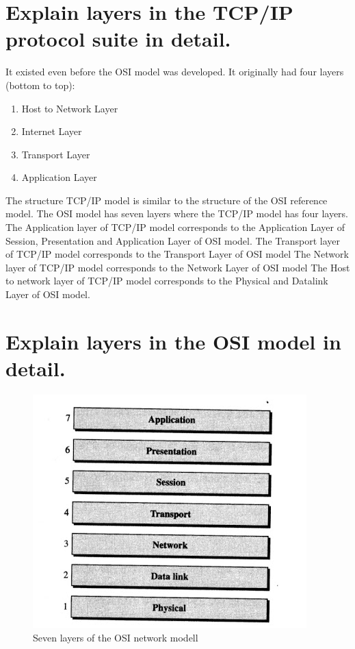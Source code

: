 \documentclass[a4paper,12pt]{report}
\begin{document}
\section*{Explain layers in the TCP/IP protocol suite in detail.}

It existed even before the OSI model was developed. It originally had four layers (bottom to top):
\begin{enumerate}
\item Host to Network Layer
\item Internet Layer
\item Transport Layer
\item Application Layer
\end{enumerate}

The structure TCP/IP model is similar to the structure of the OSI reference model. The OSI model has seven layers where the TCP/IP model has four layers. The Application layer of TCP/IP model corresponds to the Application Layer of Session, Presentation and Application Layer of OSI model. The Transport layer of TCP/IP model corresponds to the Transport Layer of OSI model The Network layer of TCP/IP model corresponds to the Network Layer of OSI model The Host to network layer of TCP/IP model corresponds to the Physical and Datalink Layer of OSI model.


\section*{Explain layers in the OSI model in detail.}

\begin{figure}[!htp]
\centering
\includegraphics[scale=0.7]{osi_model.jpg}
\caption{Seven layers of the OSI network modell}
\label{addressing}
\end{figure}
\end{document}
